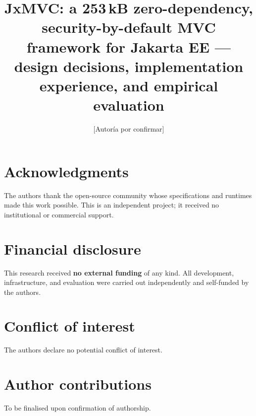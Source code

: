 \documentclass[AMA]{USG}
\title{JxMVC: a 253\,kB zero-dependency, security-by-default MVC
  framework for Jakarta EE --- design decisions, implementation
  experience, and empirical evaluation}
\author[1]{[Autor\'ia por confirmar]}
\begin{document}
\maketitle









\section*{Acknowledgments}
The authors thank the open-source community whose specifications and
runtimes made this work possible. This is an independent project; it
received no institutional or commercial support.

\section*{Financial disclosure}
This research received \textbf{no external funding} of any kind. All
development, infrastructure, and evaluation were carried out
independently and self-funded by the authors.

\section*{Conflict of interest}
The authors declare no potential conflict of interest.

\section*{Author contributions}
To be finalised upon confirmation of authorship.

\end{document}
